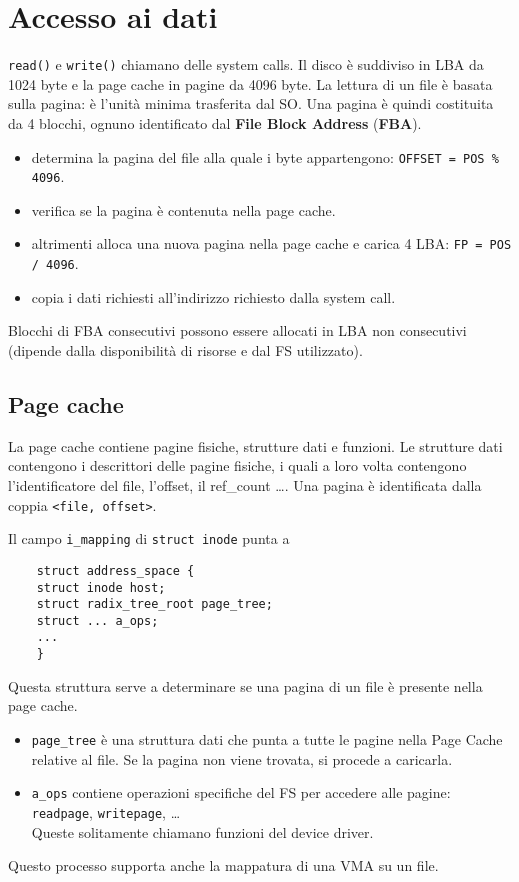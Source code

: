 \documentclass[12pt, a4paper]{report}
\begin{document}
\section{Accesso ai dati}
\texttt{read()} e \texttt{write()} chiamano delle system calls. Il disco è
suddiviso in LBA da 1024 byte e la page cache in pagine da 4096 byte. La lettura
di un file è basata sulla pagina: è l'unità minima trasferita dal SO. Una
pagina è quindi costituita da 4 blocchi, ognuno identificato dal \textbf{File
Block Address} (\textbf{FBA}).
\begin{itemize}
	\item determina la pagina del file alla quale i byte appartengono:
		\texttt{OFFSET = POS \% 4096}.
	\item verifica se la pagina è contenuta nella page cache.
	\item altrimenti alloca una nuova pagina nella page cache e carica 4 LBA:
		\texttt{FP = POS / 4096}.
	\item copia i dati richiesti all'indirizzo richiesto dalla system call.
\end{itemize}
Blocchi di FBA consecutivi possono essere allocati in LBA non consecutivi
(dipende dalla disponibilità di risorse e dal FS utilizzato).
\subsection{Page cache}
La page cache contiene pagine fisiche, strutture dati e funzioni. Le strutture
dati contengono i descrittori delle pagine fisiche, i quali a loro volta
contengono l'identificatore del file, l'offset, il ref\_count \dots. Una pagina
è identificata dalla coppia \texttt{<file, offset>}.

Il campo \texttt{i\_mapping} di \texttt{struct inode} punta a
\begin{verbatim}
	struct address_space {
	struct inode host;
	struct radix_tree_root page_tree;
	struct ... a_ops;
	...
	}
\end{verbatim}
Questa struttura serve a determinare se una pagina di un file è presente nella
page cache.
\begin{itemize}
	\item \texttt{page\_tree} è una struttura dati che punta a tutte le pagine
		nella Page Cache relative al file. Se la pagina non viene trovata, si
		procede a caricarla.
	\item \texttt{a\_ops} contiene operazioni specifiche del FS per accedere
		alle pagine:\\
		\texttt{readpage}, \texttt{writepage}, \dots \\
		Queste solitamente chiamano funzioni del device driver.
\end{itemize}
Questo processo supporta anche la mappatura di una VMA su un file.
\end{document}
